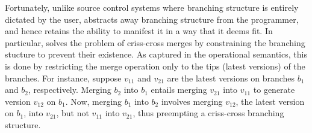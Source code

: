 Fortunately, unlike source control systems where branching structure
is entirely dictated by the user, \name abstracts away branching
structure from the programmer, and hence retains the ability to
manifest it in a way that it deems fit. In particular, \name solves
the problem of criss-cross merges by constraining the branching
stucture to prevent their existence. As captured in the operational
semantics, this is done by restricting the merge operation only to the
tips (latest versions) of the branches. For instance, suppose $v_{11}$
and $v_{21}$ are the latest versions on branches $b_1$ and $b_2$,
respectively. Merging $b_2$ into $b_1$ entails merging $v_{21}$ into
$v_{11}$ to generate version $v_{12}$ on $b_1$.  Now, merging $b_1$
into $b_2$ involves merging $v_{12}$, the latest version on $b_1$,
into $v_{21}$, but not $v_{11}$ into $v_{21}$, thus preempting a
criss-cross branching structure.


